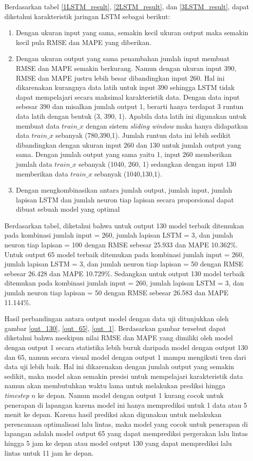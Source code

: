 \documentclass[../thesis.tex]{subfiles}
\begin{document}
Berdasarkan tabel \ref{1LSTM_result}, \ref{2LSTM_result}, dan \ref{3LSTM_result}, dapat diketahui karakteristik jaringan LSTM sebagai berikut:
\begin{enumerate}
	\item Dengan ukuran input yang sama, semakin kecil ukuran output maka semakin kecil pula RMSE dan MAPE yang diberikan. 
	\item Dengan ukuran output yang sama penambahan jumlah input membuat RMSE dan MAPE semakin berkurang. Namun dengan ukuran input 390, RMSE dan MAPE justru lebih besar dibandingkan input 260. Hal ini dikarenakan kurangnya data latih untuk input 390 sehingga LSTM tidak dapat mempelajari secara maksimal karakteristik data. Dengan data input sebesar 390  dan misalkan jumlah output 1, berarti hanya terdapat 3 runtun data latih dengan bentuk (3, 390, 1). Apabila data latih ini digunakan untuk membuat data $train\_x$ dengan sistem \textit{sliding window} maka hanya didapatkan data $train\_x$ sebanyak (780,390,1). Jumlah runtun data ini lebih sedikit dibandingkan dengan ukuran input 260 dan 130 untuk jumlah output yang sama. Dengan jumlah output yang sama yaitu 1, input 260 memberikan jumlah data $train\_x$ sebanyak (1040, 260, 1) sedangkan dengan input 130 memberikan data $train\_x$ sebanyak (1040,130,1).
	\item Dengan mengkombinasikan antara jumlah output, jumlah input, jumlah lapisan LSTM dan jumlah neuron tiap lapisan secara proporsional dapat dibuat sebuah model yang optimal  
\end{enumerate}

Berdasarkan tabel, diketahui bahwa untuk output 130 model terbaik ditemukan pada kombinasi jumlah input = 260, jumlah lapisan LSTM = 3, dan jumlah neuron tiap lapisan = 100 dengan RMSE sebesar 25.933 dan MAPE 10.362\%. Untuk output 65 model terbaik ditemukan pada kombinasi jumlah input = 260, jumlah lapisan LSTM = 3, dan jumlah neuron tiap lapisan = 50 dengan RMSE sebesar 26.428 dan MAPE 10.729\%.
Sedangkan untuk output 130 model terbaik ditemukan pada kombinasi jumlah input = 260, jumlah lapisan LSTM = 3, dan jumlah neuron tiap lapisan = 50 dengan RMSE sebesar 26.583 dan MAPE 11.144\%.

Hasil perbandingan antara output model dengan data uji ditunjukkan oleh gambar \ref{out_130}, \ref{out_65}, \ref{out_1}. Berdasarkan gambar tersebut dapat diketahui bahwa meskipun nilai RMSE dan MAPE yang dimiliki oleh model dengan output 1 secara statistika lebih buruk daripada model dengan output 130 dan 65, namun secara visual model dengan output 1 mampu mengikuti tren dari data uji lebih baik. Hal ini dikarenakan dengan jumlah output yang semakin sedikit, maka model akan semakin presisi untuk mempelajari karakteristik data namun
akan membutuhkan waktu lama untuk melakukan prediksi hingga \textit{timestep} $n$ ke depan. Namun model dengan output 1 kurang cocok untuk penerapan di lapangan karena model ini hanya memprediksi untuk 1 data atau 5 menit ke depan.
Karena hasil prediksi akan digunakan untuk melakukan perencanaan optimalisasi lalu lintas, maka model yang cocok untuk penerapan di lapangan adalah model output 65 yang dapat memprediksi pergerakan lalu lintas hingga 5 jam ke depan atau model output 130 yang dapat memprediksi lalu lintas untuk 11 jam ke depan.
\end{document}
